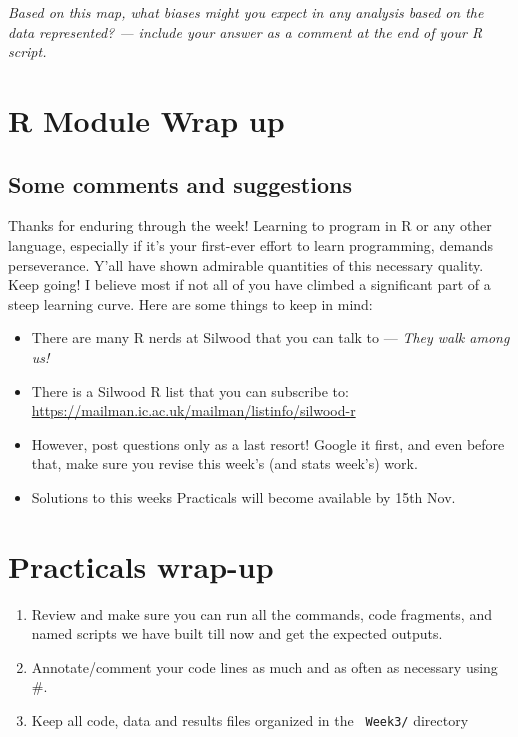 \begin{enumerate}
\begin{compactitem}[$\quad\star$]
\item {\it Based on this map, what biases might you expect in any analysis 
based on the data represented? --- {\it include your answer as a comment at 
the end of your R script}. } 
\end{compactitem}

\end{enumerate}

\section{R Module Wrap up}
 
 \subsection{Some comments and suggestions}

Thanks for enduring through the week! Learning to program in R or any 
other language, especially if it's your first-ever effort to learn 
programming, demands perseverance. Y'all have shown admirable 
quantities of this necessary quality. Keep going! I believe most if not 
all of you have climbed a significant part of a steep learning curve. 
Here are some things to keep in mind:

\begin{itemize}\itemsep2pt

\item There are many R nerds at Silwood that you can talk to --- {\it 
They walk among us!}

\item There is a Silwood R list that you can subscribe to: 
\url{https://mailman.ic.ac.uk/mailman/listinfo/silwood-r}

\item However, post questions only as a last resort! Google it first, 
and even before that, make sure you revise this week's (and stats 
week's) work.

\item Solutions to this weeks Practicals will become available by 15th 
Nov.

\end{itemize}

\section{Practicals wrap-up}

  \begin{enumerate}

	\item Review and make sure you can run all the commands, code 
	fragments, and named scripts we have built till now and get the 
	expected outputs.

	\item Annotate/comment your code lines as much and as often as 
	necessary using \#.
	
	\item Keep all code, data and results files organized in the {\tt 
	Week3/} directory
	 
   \end{enumerate}

